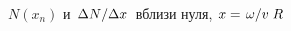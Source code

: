 \documentclass[compress]{beamer}
\begin{document}
    \begin{frame}

        \begin{figure}[h]
            \centering
            \hspace{8pt}%
            \hspace{8pt}%
            \caption[]{$N(x_n)$ и $\flatfrac{\Delta N}{\Delta x}$ вблизи нуля, $x = \flatfrac{\omega}{v} R$}
        \end{figure}

    \end{frame}

\end{document}

